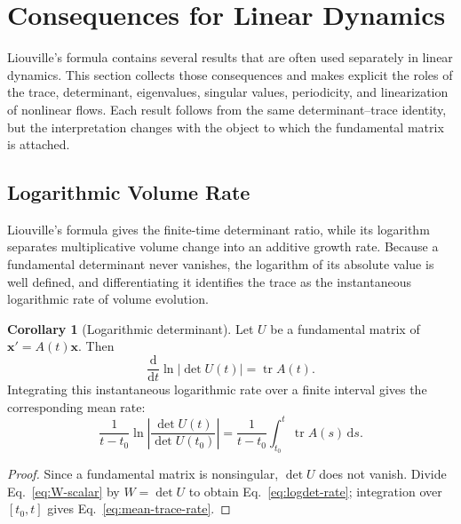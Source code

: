\documentclass[11pt,a4paper]{article}
\newcommand{\be}{\begin{equation}}
\newcommand{\ee}{\end{equation}}
\newcommand{\lb}[1]{\label{#1}}
\newcommand{\dd}{\mathrm{d}}
\DeclareMathOperator{\tr}{tr}
\theoremstyle{definition}
\newtheorem{corollary}{Corollary}[section]
\numberwithin{equation}{section}
\begin{document}
\section{Consequences for Linear Dynamics}
\label{sec:linear-consequences}

Liouville's formula contains several results that are often used separately in linear dynamics. This section collects those consequences and makes explicit the roles of the trace, determinant, eigenvalues, singular values, periodicity, and linearization of nonlinear flows. Each result follows from the same determinant--trace identity, but the interpretation changes with the object to which the fundamental matrix is attached.

\subsection{Logarithmic Volume Rate}

Liouville's formula gives the finite-time determinant ratio, while its logarithm separates multiplicative volume change into an additive growth rate. Because a fundamental determinant never vanishes, the logarithm of its absolute value is well defined, and differentiating it identifies the trace as the instantaneous logarithmic rate of volume evolution.

\begin{corollary}[Logarithmic determinant]
Let $U$ be a fundamental matrix of $\mathbf{x}'=A(t)\mathbf{x}$. Then
\be
\frac{\dd}{\dd t}\ln|\det U(t)|=\tr A(t).
\lb{eq:logdet-rate}
\ee
Integrating this instantaneous logarithmic rate over a finite interval gives the corresponding mean rate:
\be
\frac{1}{t-t_0}\ln\left|
\frac{\det U(t)}{\det U(t_0)}
\right|
=
\frac{1}{t-t_0}\int_{t_0}^{t}\tr A(s)\,\dd s.
\lb{eq:mean-trace-rate}
\ee
\end{corollary}

\begin{proof}
Since a fundamental matrix is nonsingular, $\det U$ does not vanish. Divide Eq.~\eqref{eq:W-scalar} by $W=\det U$ to obtain Eq.~\eqref{eq:logdet-rate}; integration over $[t_0,t]$ gives Eq.~\eqref{eq:mean-trace-rate}.
\end{proof}
\end{document}
